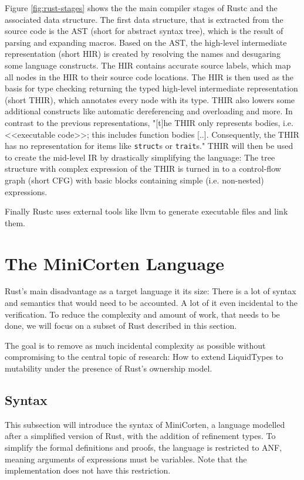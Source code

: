 \documentclass{book}
\newcommand{\code}[1]{\texttt{#1}}
\theoremstyle{definition}
\begin{document}
Figure \ref{fig:rust-stages} shows the the main compiler stages of Rustc and the associated data structure. The first data structure, that is extracted from the source code is the AST (short for abstract syntax tree), which is the result of parsing and expanding macros. 
Based on the AST, the high-level intermediate representation (short HIR) is created by resolving the names and desugaring some language constructs. The HIR contains accurate source labels, which map all nodes in the HIR to their source code locations. 
The HIR is then used as the basis for type checking returning the typed high-level intermediate representation (short THIR), which annotates every node with its type. THIR also lowers some additional constructs like automatic dereferencing and overloading and more. In contrast to the previous representations, "[t]he THIR only represents bodies, i.e. <<executable code>>; this includes function bodies [..]. Consequently, the THIR has no representation for items like \code{struct}s or \code{trait}s." \cite[p. 1]{noauthor_thir_nodate}
THIR will then be used to create the mid-level IR by drastically simplifying the language: The tree structure with complex expression of the THIR is turned in to a control-flow graph (short CFG) with basic blocks containing simple (i.e. non-nested) expressions.

Finally Rustc uses external tools \- like llvm \- to generate executable files and link them.


\chapter{The MiniCorten Language}

Rust's main disadvantage as a target language it its size: There is a lot of syntax and semantics that would need to be accounted. A lot of it even incidental to the verification. To reduce the complexity and amount of work, that needs to be done, we will focus on a subset of Rust described in this section.

The goal is to remove as much incidental complexity as possible without compromising to the central topic of research: How to extend LiquidTypes to mutability under the presence of Rust's ownership model.


\section{Syntax}

This subsection will introduce the syntax of MiniCorten, a language modelled after a simplified version of Rust, with the addition of refinement types.
To simplify the formal definitions and proofs, the language is restricted to ANF, meaning arguments of expressions must be variables. Note that the implementation does not have this restriction.
\end{document}
